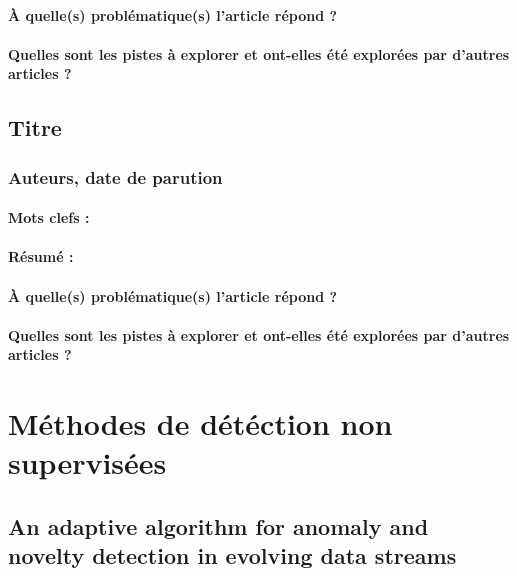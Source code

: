 \documentclass[11pt,a4paper]{report}
\begin{document}
\paragraph{À quelle(s) problématique(s) l'article répond ?}

\paragraph{Quelles sont les pistes à explorer et ont-elles  été explorées par d'autres articles ?}






\subsection{Titre}
\subsubsection{Auteurs, date de parution}

\paragraph{Mots clefs :}

\paragraph{Résumé :}

\paragraph{À quelle(s) problématique(s) l'article répond ?}

\paragraph{Quelles sont les pistes à explorer et ont-elles  été explorées par d'autres articles ?}




\newpage






\section{Méthodes de détéction non supervisées}

\subsection{An adaptive algorithm for anomaly and novelty detection in evolving data streams}
\end{document}
